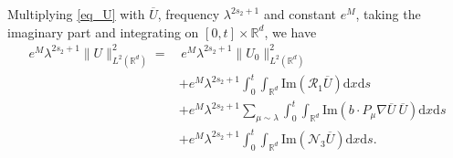 \documentclass[10pt,twoside,a4paper]{article}
\numberwithin{equation}{section}\allowdisplaybreaks
\begin{document}

Multiplying \eqref{eq_U} with $ \overline{U} $, frequency $  \lambda^{2s_2+1} $ and constant $ e^{M} $, taking the imaginary part and integrating on $ [0,t]\times \mathbb{R}^d $, we have  
\begin{align}
	e^{M} \lambda^{2s_2+1}	\|U\|_{L^{2}(\mathbb{R}^d)}^2= & \,	e^{M} \lambda^{2s_2+1}	\|U_0\|_{L^{2}(\mathbb{R}^d)}^2\nonumber\\
	&+e^{M}\lambda^{2s_2+1}\int_0^t \int_{\mathbb{R}^d}  \mathrm{Im} \left(   \mathcal{R}_1\overline{U}\right)  \mathrm{d} x \mathrm{d} s \label{Big_en_maint1}\\
	&+ e^{M}\lambda^{2s_2+1} \sum_{\mu\sim \lambda}\int_0^t \int_{\mathbb{R}^d}  \mathrm{Im} \left(   b\cdot  P_\mu \nabla \overline{U}~\overline{U}\right)  \mathrm{d} x \mathrm{d} s\label{Big_en_maint2}\\
	&+e^{M} \lambda^{2s_2+1}\int_0^t \int_{\mathbb{R}^d}  \mathrm{Im} \left(   \mathcal{N}_3\overline{U}\right)  \mathrm{d} x \mathrm{d} s.\label{Big_en_maint3}
\end{align}
\end{document}
